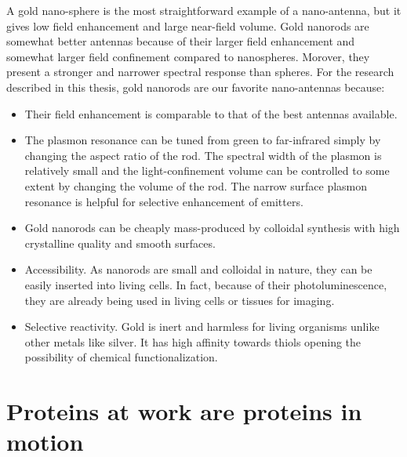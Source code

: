 A gold nano-sphere is the most straightforward example of a nano-antenna, but it gives low field enhancement and large near-field volume.\cite{punj2013gold}
Gold nanorods are somewhat better antennas because of their larger field enhancement and somewhat larger field confinement compared to nanospheres. Morover, they present a stronger and narrower spectral response than spheres. For the research described in this thesis, gold nanorods are our favorite nano-antennas because:
\begin{itemize}
	\item Their field enhancement is comparable to that of the best antennas available.
	\item The plasmon resonance can be tuned from green to far-infrared simply by changing the aspect ratio of the rod.\cite{link1999simulation}
	The spectral width of the plasmon is relatively small and the light-confinement volume can be controlled to some extent by changing the volume of the rod.
	The narrow surface plasmon resonance is helpful for selective enhancement of emitters.\cite{yuan2013thousandfold,khatua2014resonant}
	\item Gold nanorods can be cheaply mass-produced by colloidal synthesis with high crystalline quality and smooth surfaces.\cite{nikoobakht2003preparation,perezjuste2005gold}
	\item Accessibility. As nanorods are small and colloidal in nature, they can be easily inserted into living cells.\cite{el2005surface,chithrani2007elucidating,pan2007size,lvy2010gold,moser2016cellular}
	In fact, because of their photoluminescence, they are already being used in living cells or tissues for imaging.
	\item Selective reactivity. Gold is inert and harmless for living organisms unlike other metals like silver.
	It has high affinity towards thiols opening the possibility of chemical functionalization.
\end{itemize}
%
\section{Proteins at work are proteins in motion}


